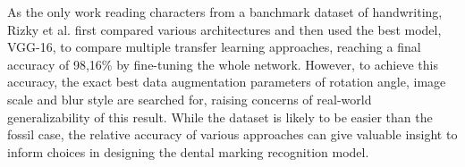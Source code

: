 \documentclass{article}
\begin{document}






As the only work reading characters from a banchmark dataset of handwriting, Rizky et al. \cite{7rizkybasicCnnTransfer}
first compared various architectures and then used the best model, VGG-16, to compare multiple transfer learning 
approaches, reaching a final accuracy of 98,16\% by fine-tuning the whole network. However, to achieve this accuracy, the exact best data augmentation parameters of 
rotation angle, image scale and blur style are searched for, raising concerns of real-world generalizability of this result.
 While the dataset is likely to be easier than the fossil case, the relative accuracy of 
various approaches can give valuable insight to inform choices in designing the dental marking recognition model.
\end{document}
